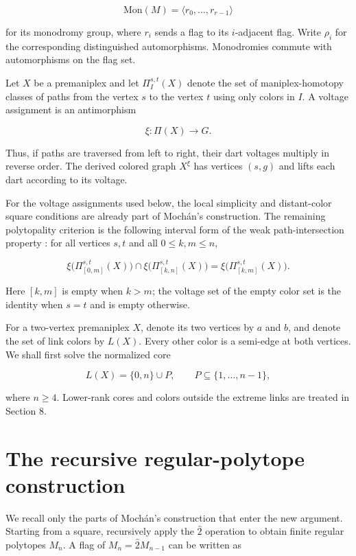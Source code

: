 \documentclass[11pt]{article}
\begin{document}
\[
\mathrm{Mon}(M)=\langle r_0,\ldots,r_{r-1}\rangle
\]

for its monodromy group, where $r_i$ sends a flag to its $i$-adjacent flag. Write $\rho_i$ for the
corresponding distinguished automorphisms. Monodromies commute with automorphisms on the flag set.

Let $X$ be a premaniplex and let $\Pi_I^{s,t}(X)$ denote the set of maniplex-homotopy classes of
paths from the vertex $s$ to the vertex $t$ using only colors in $I$. A voltage assignment is an
antimorphism

\[
\xi:\Pi(X)\longrightarrow G.
\]

Thus, if paths are traversed from left to right, their dart voltages multiply in reverse order.
The derived colored graph $X^\xi$ has vertices $(s,g)$ and lifts each dart according to its voltage.

For the voltage assignments used below, the local simplicity and distant-color square conditions
are already part of Mochán's construction. The remaining polytopality criterion is the following
interval form of the weak path-intersection property \cite[Theorem 4.2]{hm2023}: for all vertices $s,t$ and all
$0\leq k,m\leq n$,

\[
\xi\bigl(\Pi_{[0,m]}^{s,t}(X)\bigr)
\cap
\xi\bigl(\Pi_{[k,n]}^{s,t}(X)\bigr)
=
\xi\bigl(\Pi_{[k,m]}^{s,t}(X)\bigr).
\tag{1}
\]

Here $[k,m]$ is empty when $k>m$; the voltage set of the empty color set is the identity when
$s=t$ and is empty otherwise.

For a two-vertex premaniplex $X$, denote its two vertices by $a$ and $b$, and denote the set of link
colors by $L(X)$. Every other color is a semi-edge at both vertices. We shall first solve the
normalized core

\[
L(X)=\{0,n\}\cup P,
\qquad P\subseteq\{1,\ldots,n-1\},
\tag{2}
\]

where $n\geq4$. Lower-rank cores and colors outside the extreme links are treated in Section 8.


\section{The recursive regular-polytope construction}

We recall only the parts of Mochán's construction \cite[Sections 4--6]{mochan2024} that enter the new argument.
Starting from a square, recursively apply the $\widehat 2$ operation to obtain finite regular
polytopes $M_n$. A flag of $M_n=\widehat 2M_{n-1}$ can be written as
\end{document}
